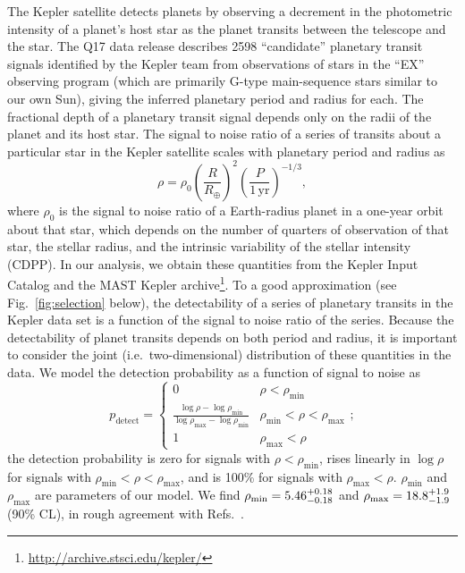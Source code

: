 \documentclass{nature}
\newcommand{\REarth}{R_\oplus}
\newcommand{\rhomin}{\rho_\mathrm{min}}
\newcommand{\rhomax}{\rho_\mathrm{max}}
\begin{document}
The Kepler satellite detects planets by observing a decrement in the
photometric intensity of a planet's host star as the planet transits
between the telescope and the star.  The Q17 data release describes
2598 ``candidate'' planetary transit signals identified by the Kepler
team from observations of stars in the ``EX'' observing program (which
are primarily G-type main-sequence stars similar to our own
Sun\cite{Batalha2010}), giving the inferred planetary period and
radius for each.  The fractional depth of a planetary transit signal
depends only on the radii of the planet and its host star.  The signal
to noise ratio of a series of transits about a particular star in the
Kepler satellite scales with planetary period and radius
as\cite{Chatterjee2012}
\begin{equation}
  \rho = \rho_0 \left( \frac{R}{\REarth} \right)^2 \left(
  \frac{P}{1\,\mathrm{yr}} \right)^{-1/3},
\end{equation}
where $\rho_0$ is the signal to noise ratio of a Earth-radius planet
in a one-year orbit about that star, which depends on the number of
quarters of observation of that star, the stellar radius, and the
intrinsic variability of the stellar intensity
(CDPP\cite{Christiansen2012}).  In our analysis, we obtain these
quantities from the Kepler Input Catalog\cite{Batalha2010,Brown2011}
and the MAST Kepler
archive\footnote{\url{http://archive.stsci.edu/kepler/}}.  To a good
approximation (see Fig.\ \ref{fig:selection} below), the detectability
of a series of planetary transits in the Kepler data set is a function
of the signal to noise ratio of the series.  Because the detectability
of planet transits depends on both period and radius, it is important
to consider the joint (i.e.\ two-dimensional) distribution of these
quantities in the data\cite{Tabachnik2002,Youdin2011}.  We model the
detection probability as a function of signal to noise as
\begin{equation}
  \label{eq:pdetect}
  p_\mathrm{detect} = \begin{cases}
    0 & \rho < \rhomin \\
    \frac{\log \rho - \log \rhomin}{\log \rhomax - \log \rhomin} &
    \rhomin < \rho < \rhomax \\
    1 & \rhomax < \rho
  \end{cases};
\end{equation}
the detection probability is zero for signals with $\rho < \rhomin$,
rises linearly in $\log \rho$ for signals with $\rhomin < \rho <
\rhomax$, and is 100\% for signals with $\rhomax < \rho$.  $\rhomin$
and $\rhomax$ are parameters of our model.  We find $\rhomin =
\rhominrange$ and $\rhomax = \rhomaxrange$ (90\% CL), in rough
agreement with Refs.\ \cite{Borucki2011,Batalha2013}.
\end{document}
